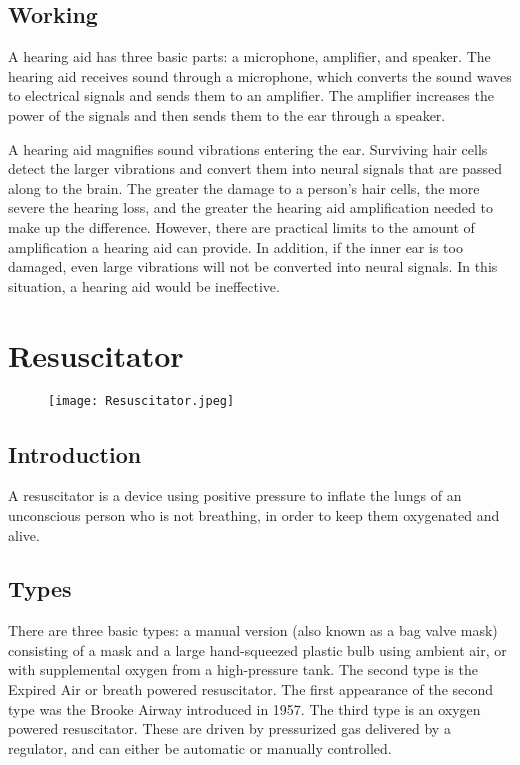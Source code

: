 \documentclass[12pt]{article}
\begin{document}
\subsection{Working}

A hearing aid has three basic parts: a microphone, amplifier, and speaker. The hearing aid receives sound through a microphone, which converts the sound waves to electrical signals and sends them to an amplifier. The amplifier increases the power of the signals and then sends them to the ear through a speaker.


A hearing aid magnifies sound vibrations entering the ear. Surviving hair cells detect the larger vibrations and convert them into neural signals that are passed along to the brain. The greater the damage to a person’s hair cells, the more severe the hearing loss, and the greater the hearing aid amplification needed to make up the difference. However, there are practical limits to the amount of amplification a hearing aid can provide. In addition, if the inner ear is too damaged, even large vibrations will not be converted into neural signals. In this situation, a hearing aid would be ineffective.


\section{Resuscitator}

\begin{figure}[h]
\texttt{[image: Resuscitator.jpeg]}
\centering
\end{figure}

\subsection{Introduction}

A resuscitator is a device using positive pressure to inflate the lungs of an unconscious person who is not breathing, in order to keep them oxygenated and alive.


\subsection{Types}

There are three basic types: a manual version (also known as a bag valve mask) consisting of a mask and a large hand-squeezed plastic bulb using ambient air, or with supplemental oxygen from a high-pressure tank. The second type is the Expired Air or breath powered resuscitator. The first appearance of the second type was the Brooke Airway introduced in 1957. The third type is an oxygen powered resuscitator. These are driven by pressurized gas delivered by a regulator, and can either be automatic or manually controlled.
\end{document}
